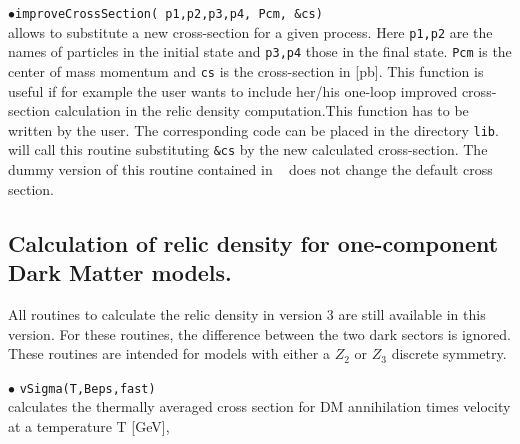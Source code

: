 \documentclass[12pt,a4paper]{article}
\begin{document}
\noindent$\bullet$\verb|improveCrossSection( p1,p2,p3,p4, Pcm, &cs)|\\
allows to substitute a new cross-section for a given process. Here \verb|p1,p2| are the names of particles in the initial state and \verb|p3,p4| those in the final state. \verb|Pcm| is the center of mass momentum and \verb|cs| is the cross-section in [pb]. This function is useful if for example the user wants to include her/his one-loop improved cross-section calculation in the relic density computation.This function has to be written by the user. The corresponding code can be placed in the directory \verb|lib|. \micro~ will call this routine substituting \verb|&cs| by the new calculated cross-section. The dummy version of this routine contained in \micro~ does not change the default cross section. 



\subsection{Calculation of relic density for one-component Dark Matter models.}
\label{sec:one_component}
All routines to calculate the relic density in  version 3 are still available in this version. For these routines,  the difference between 
the two dark sectors is ignored. These routines are intended for models with either a $Z_2$ or $Z_3$ discrete symmetry.
  
\noindent
$\bullet$ \verb|vSigma(T,Beps,fast)|\\
calculates the thermally averaged cross section for DM annihilation  times velocity  
at a  temperature T [GeV],
\end{document}
